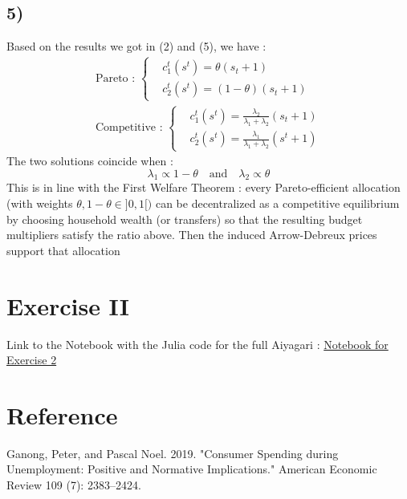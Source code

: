 \documentclass{article}
\begin{document}
\subsection{5)}
Based on the results we got in (2) and (5), we have : 
$$\begin{aligned}
    \text{Pareto : }\left\{\begin{aligned} &c_1^t(s^t) = \theta (s_t+1)\\
    &c_2^t(s^t)=(1-\theta)(s_t+1)
    \end{aligned}\right.\\
    \text{Competitive : } \left\{\begin{aligned} &c_1^t(s^t) = \frac{\lambda_2}{\lambda_1+\lambda_2} (s_t+1)\\
    &c_2^t(s^t)=\frac{\lambda_1}{\lambda_1+\lambda_2}(s^t+1)
    \end{aligned}\right.
\end{aligned}$$
The two solutions coincide when : 
$$\lambda_1 \propto 1-\theta \quad \text{and} \quad \lambda_2\propto \theta$$
This is in line with the First Welfare Theorem : every Pareto-efficient allocation (with weights $\theta,1-\theta\in]0,1[)$ can be decentralized as a competitive equilibrium by choosing household wealth (or transfers) so that the resulting budget multipliers satisfy the ratio above. Then the induced Arrow-Debreux prices support that allocation

 
\section{Exercise II}

Link to the Notebook with the Julia code for the full Aiyagari : \href{https://pluto.land/n/mugr1ub9}{Notebook for Exercise 2} 

\section{Reference}
Ganong, Peter, and Pascal Noel. 2019. "Consumer Spending during Unemployment: Positive and Normative Implications." American Economic Review 109 (7): 2383–2424.
\end{document}
